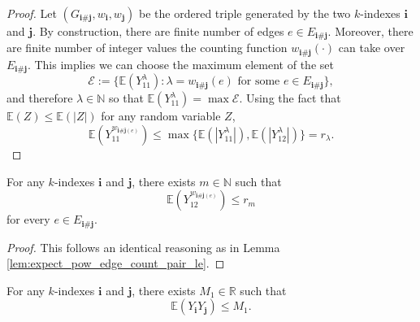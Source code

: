 \begin{proof}
  Let $(G_{\mathbf{i}\#\mathbf{j}},w_\mathbf{i},w_\mathbf{j})$ be the ordered triple generated by the two $k$-indexes $\mathbf{i}$ and $\mathbf{j}$. 
  By construction, there are finite number of edges $e \in E_{\mathbf{i} \# \mathbf{j}}$.
  Moreover, there are finite number of integer values the counting function $w_{\mathbf{i} \# \mathbf{j}}(\cdot)$ can take over $E_{\mathbf{i} \# \mathbf{j}}$.
  This implies we can choose the maximum element of the set
  \[
  \mathscr{E} := \{ \mathbb{E} (Y_{11}^\lambda) : \lambda = w_{\mathbf{i} \# \mathbf{j}}(e) \text{ for some } e \in E_{\mathbf{i} \# \mathbf{j}} \},
  \]
  and therefore $\lambda \in \mathbb{N}$ so that $\mathbb{E}(Y_{11}^\lambda) = \max \mathscr{E}$.
  Using the fact that $\mathbb{E}(Z) \leq \mathbb{E}(|Z|)$ for any random variable $Z$,
  \[
  \mathbb{E} (Y_{11}^{w_{\mathbf{i} \# \mathbf{j} (e)}}) \leq \max\{ \mathbb{E}(|Y_{11}^\lambda|), \mathbb{E}(|Y_{12}^\lambda|) \} = r_\lambda.
  \]
\end{proof}
\begin{lemma} %
  \notready
  \label{lem:expect_pow_edge_count_pair_le'}
  For any $k$-indexes $\mathbf{i}$ and $\mathbf{j}$, there exists $m \in \mathbb{N}$ such that
  \[
  \mathbb{E} (Y_{12}^{w_{\mathbf{i} \# \mathbf{j} (e)}}) \leq r_m
  \]
  for every $e \in E_{\mathbf{i} \# \mathbf{j}}$.
\end{lemma}
\begin{proof}
  This follows an identical reasoning as in Lemma \ref{lem:expect_pow_edge_count_pair_le}.
\end{proof}
\begin{lemma}
  \notready
  \label{lem:expect_mul_le_const}
  For any $k$-indexes $\mathbf{i}$ and $\mathbf{j}$, there exists $M_1 \in \mathbb{R}$ such that
  \[
  \mathbb{E} (Y_\mathbf{i}Y_\mathbf{j}) \leq M_1.
  \]
\end{lemma}
